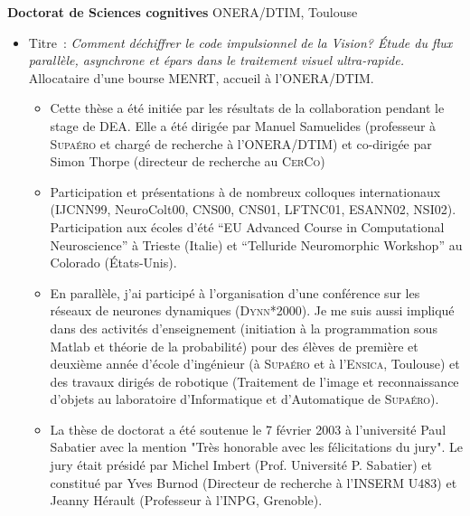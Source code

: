 \documentclass[10pt,french,a4paper,oneside]{article}%
\newcommand{\years}[1]{\marginpar{\textit{\scriptsize #1}}}
\begin{document}
\vspace*{.3cm}
	\textbf{Doctorat de Sciences cognitives} ONERA/DTIM, Toulouse \hfill \years{\textbf{1999-2003}} \\
\vspace*{-.15in}
\begin{itemize}
\item[] Titre~: \emph{Comment déchiffrer le code impulsionnel de la Vision? \'Etude du flux parallèle, asynchrone et épars  dans le traitement visuel ultra-rapide.}  Allocataire d'une bourse MENRT, accueil à  l'ONERA/DTIM.
\begin{itemize}
		\item %
		Cette thèse a été initiée par les résultats de la collaboration pendant le stage de DEA. Elle a été dirigée par Manuel Samuelides (professeur à  \textsc{Supaéro} et chargé de recherche à  l'ONERA/DTIM) et co-dirigée par Simon Thorpe (directeur de recherche au \textsc{CerCo})
		\item Participation et présentations à  de nombreux colloques internationaux (IJCNN99, NeuroColt00, CNS00, CNS01, LFTNC01, ESANN02, NSI02). Participation aux écoles d'été ``EU Advanced Course in Computational Neuroscience'' à  Trieste (Italie) et ``Telluride Neuromorphic Workshop'' au Colorado (\'Etats-Unis).
		\item %
		En parallèle, j'ai participé à  l'organisation d'une conférence sur les réseaux de neurones dynamiques (\textsc{Dynn}*2000). Je me suis aussi impliqué dans des activités d'enseignement (initiation à  la programmation sous Matlab et théorie de la probabilité) pour des élèves de première et deuxième année d'école d'ingénieur (à  \textsc{Supaéro} et à  l'\textsc{Ensica}, Toulouse) et des travaux dirigés de robotique (Traitement de l'image et reconnaissance d'objets au laboratoire d'Informatique et d'Automatique de \textsc{Supaéro}). %
		\item %
		La thèse de doctorat a été soutenue le 7 février 2003 à  l'université Paul Sabatier avec la mention "Très honorable avec les félicitations du jury". Le jury était présidé par Michel Imbert (Prof. Université P. Sabatier) et constitué par Yves Burnod (Directeur de recherche à  l'\textsc{INSERM} U483) et Jeanny Hérault (Professeur à  l'INPG, Grenoble).
	\end{itemize} %
\end{itemize} %
\end{document}
